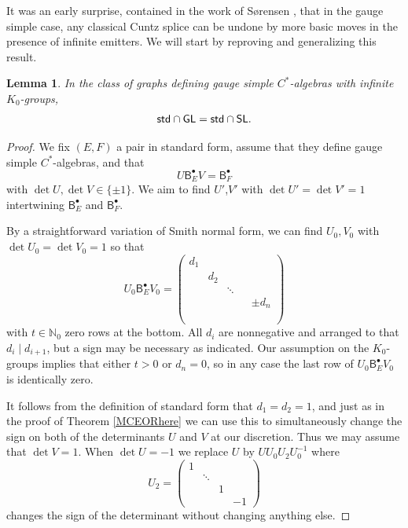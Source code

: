 \documentclass[12pt]{amsbook}%
\newcommand{\BB}{\mathsf B}
\newtheorem{lemma}[theor]{Lemma}
\theoremstyle{defin}
\theoremstyle{remark}
\numberwithin{equation}{chapter}
\numberwithin{theor}{section}
\newcommand{\NN}{\mathbb{N}}
\newcommand{\standard}{\mathsf{std}}
\newcommand{\SL}{{\sf SL}}
\newcommand{\GL}{{\sf GL}}
\begin{document}
\statusbar{\elsewhere}{\hered}{\sopen}{\sopen}{\elsewhere}{\sopenbut}{\sopen}{\sopen}

It was an early surprise, contained in the work of S\o{}rensen \cite{apws:gcsga}, that  in the gauge simple case, any classical Cuntz splice can be undone by more basic moves in the presence of infinite emitters. We will start by reproving and generalizing this result.

\begin{lemma}\label{GLisSL}
In the class of graphs defining gauge simple $C^*$-algebras with infinite $K_0$-groups,
\[
\standard\cap \GL=\standard\cap \SL.
\]
\end{lemma}
\begin{proof}
We fix $(E,F)$ a pair in standard form, assume that they define gauge simple $C^*$-algebras, and that 
\begin{equation}U\BB^\bullet_EV=\BB^\bullet_F\label{intertwine}\end{equation}  with $\det U,\det V\in\{\pm 1\}$.
We aim to find $U'$,$V'$ with  $\det U'=\det V'=1$ intertwining $\BB_E^\bullet$ and $\BB_F^\bullet$. 

By a straightforward variation of Smith normal form, we can find $U_0,V_0$ with $\det U_0=\det V_0=1$ so that 
\begin{equation}\label{smithbetter}
U_0\BB^\bullet _EV_0=\begin{pmatrix}d_1&&&&\\&d_2&&&\\&&\ddots&&\\&&&&\pm d_n\\\\\\\end{pmatrix}
\end{equation}
with $t\in\NN_0$ zero rows at the bottom. All $d_i$ are nonnegative and arranged to that $d_i\mid d_{i+1}$, but a sign may be necessary as indicated. 
Our assumption on the $K_0$-groups implies that either $t>0$ or $d_n=0$, so in any case the last row of $U_0\BB^\bullet _EV_0$ is identically zero. 


It follows from the definition of standard form that $d_1=d_2=1$, and just as in the proof of Theorem \ref{MCEORhere} we can use this to simultaneously change the sign on both of the determinants $U$ and $V$ at our discretion. Thus we may assume that $\det V=1$. When $\det U=-1$ we replace $U$ by $UU_0U_2U_0^{-1}$ where
\[
U_2=\begin{pmatrix}1&&&\\&\ddots&&\\&&1&\\&&&-1\end{pmatrix}
\]
changes the sign of the determinant without changing anything else. 
\end{proof}
\end{document}
